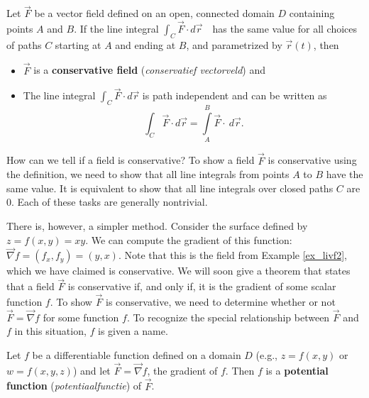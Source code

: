 \pagebreak
\begin{definition}\label{def:conservative}
Let $\vec F$ be a vector field defined on an open, connected domain $D$ containing points $A$ and $B$. If the line integral
$\int_C \vec F\cdot d\vec r$\ \ has the same value for all choices of paths $C$ starting at $A$ and ending at $B$, and parametrized by $\vec{r}(t)$,  then
\begin{itemize}
	\item $\vec F$ is a \textbf{conservative field} (\textit{conservatief vectorveld}) and
	\item	The line integral $\int_C \vec F\cdot d\vec r$ is path independent and can be written as $$\int_C \vec F\cdot d\vec r = \int\limits_A^B \vec F\cdot \ d\vec r.$$ 
\end{itemize}
\end{definition}


How can we tell if a field is conservative? To show a field $\vec F$ is conservative using the definition, we need to show that all line integrals from points $A$ to $B$ have the same value. It is equivalent to show that all line integrals over closed paths $C$ are 0. Each of these tasks are generally nontrivial.

There is, however, a simpler method. Consider the surface defined by $z = f(x,y) = xy$. We can compute the gradient of this function: $\vec{\nabla} f = \left( f_x, f_y\right) = \left( y, x\right)$. Note that this is the field from Example \ref{ex_livf2}, which we have claimed is conservative. We will soon give a theorem that states that a field $\vec F$ is conservative if, and only if, it is the gradient of some scalar function $f$. To show $\vec F$ is conservative, we need to determine whether or not $\vec F = \vec{\nabla} f$ for some function $f$. To recognize the special relationship between $\vec F$ and $f$ in this situation, $f$ is given a name.

\begin{definition}\label{def:potential}
Let $f$ be a differentiable function defined on a  domain $D$  (e.g., $z = f(x,y)$ or $w = f(x,y,z)$) and let $\vec F = \vec{\nabla} f$, the gradient of $f$. Then $f$ is a \textbf{potential function} (\textit{potentiaalfunctie}) of $\vec F$.
\end{definition}

